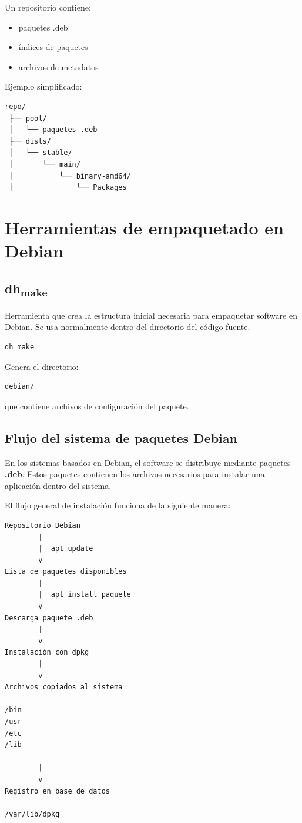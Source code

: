 \documentclass[11pt, letterpaper]{article}
\begin{document}
Un repositorio contiene:

\begin{itemize}
\item paquetes .deb
\item índices de paquetes
\item archivos de metadatos
\end{itemize}

Ejemplo simplificado:

\begin{verbatim}
repo/
 ├── pool/
 │   └── paquetes .deb
 ├── dists/
 │   └── stable/
 │       └── main/
 │           └── binary-amd64/
 │               └── Packages
\end{verbatim}
\section{Herramientas de empaquetado en Debian}
\label{sec:org6ec8e36}

\subsection{dh\textsubscript{make}}
\label{sec:orgdfb25f2}

Herramienta que crea la estructura inicial necesaria para empaquetar software en Debian.
Se usa normalmente dentro del directorio del código fuente.

\begin{verbatim}
dh_make
\end{verbatim}

Genera el directorio:

\begin{verbatim}
debian/
\end{verbatim}

que contiene archivos de configuración del paquete.
\subsection{Flujo del sistema de paquetes Debian}
\label{sec:org43bbbbc}

En los sistemas basados en Debian, el software se distribuye mediante paquetes \textbf{.deb}. Estos paquetes contienen los archivos necesarios para instalar una aplicación dentro del sistema.

El flujo general de instalación funciona de la siguiente manera:

\begin{verbatim}
Repositorio Debian
        |
        |  apt update
        v
Lista de paquetes disponibles
        |
        |  apt install paquete
        v
Descarga paquete .deb
        |
        v
Instalación con dpkg
        |
        v
Archivos copiados al sistema

/bin
/usr
/etc
/lib

        |
        v
Registro en base de datos

/var/lib/dpkg
\end{verbatim}
\end{document}
